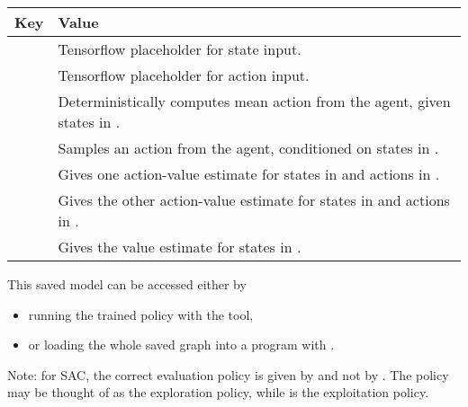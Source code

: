 \documentclass[letterpaper,10pt,english]{sphinxmanual}
\begin{document}
\begin{savenotes}\sphinxattablestart
\centering
\begin{tabulary}{\linewidth}[t]{|T|T|}
\hline
\sphinxstyletheadfamily 
Key
&\sphinxstyletheadfamily 
Value
\\
\hline
{}
&
Tensorflow placeholder for state input.
\\
\hline
{}
&
Tensorflow placeholder for action input.
\\
\hline
{}
&
Deterministically computes mean action from the agent, given states in .
\\
\hline
{}
&
Samples an action from the agent, conditioned on states in .
\\
\hline
{}
&
Gives one action-value estimate for states in  and actions in .
\\
\hline
{}
&
Gives the other action-value estimate for states in  and actions in .
\\
\hline
{}
&
Gives the value estimate for states in .
\\
\hline
\end{tabulary}
\par
\sphinxattableend\end{savenotes}

This saved model can be accessed either by
\begin{itemize}
\item {} 
running the trained policy with the  tool,

\item {} 
or loading the whole saved graph into a program with .

\end{itemize}

Note: for SAC, the correct evaluation policy is given by  and not by . The policy  may be thought of as the exploration policy, while  is the exploitation policy.
\end{document}
